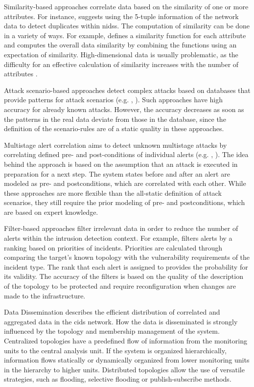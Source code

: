Similarity-based approaches correlate data based on the similarity of one or more attributes. For instance, \cite{goo_2001} suggests using the 5-tuple information of the network data to detect duplicates within \gls{nids}s. The computation of similarity can be done in a variety of ways. For example, \cite{goo_2001b} defines a similarity function for each attribute and computes the overall data similarity by combining the functions using an expectation of similarity. High-dimensional data is usually problematic, as the difficulty for an effective calculation of similarity increases with the number of attributes \cite{zho_2009}.

Attack scenario-based approaches detect complex attacks based on databases that provide patterns for attack scenarios (e.g. \cite{hut_2004}, \cite{jaj_2002}). Such approaches have high accuracy for already known attacks. However, the accuracy decreases as soon as the patterns in the real data deviate from those in the database, since the definition of the scenario-rules are of a static quality in these approaches.

Multistage alert correlation aims to detect unknown multistage attacks by correlating defined pre- and post-conditions of individual alerts (e.g. \cite{cup_2002}, \cite{che_2003}). The idea behind the approach is based on the assumption that an attack is executed in preparation for a next step. The system states before and after an alert are modeled as pre- and postconditions, which are correlated with each other. While these approaches are more flexible than the all-static definition of attack scenarios, they still require the prior modeling of pre- and postconditions, which are based on expert knowledge.

Filter-based approaches filter irrelevant data in order to reduce the number of alerts within the intrusion detection context. For example, \cite{goo_2002} filters alerts by a ranking based on priorities of incidents. Priorities are calculated through comparing the target's known topology with the vulnerability requirements of the incident type. The rank that each alert is assigned to provides the probability for its validity. The accuracy of the filters is based on the quality of the description of the topology to be protected and require reconfiguration when changes are made to the infrastructure.

Data Dissemination describes the efficient distribution of correlated and aggregated data in the \gls{cids} network. How the data is disseminated is strongly influenced by the topology and membership management of the system. Centralized topologies have a predefined flow of information from the monitoring units to the central analysis unit. If the system is organized hierarchically, information flows statically or dynamically organized from lower monitoring units in the hierarchy to higher units. Distributed topologies allow the use of versatile strategies, such as flooding, selective flooding or publish-subscribe methods.

